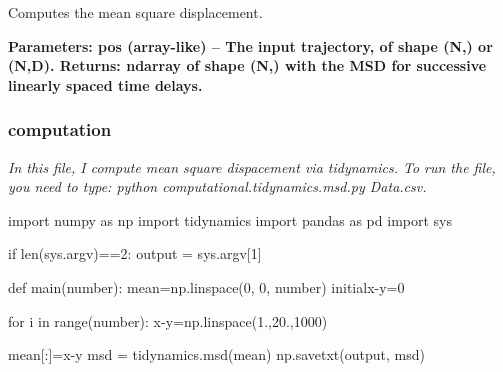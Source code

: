 \documentclass[12pt, a4paper, twoside]{report}
\begin{document}
Computes the mean square displacement.


\textbf{
Parameters:	pos (array-like) – The input trajectory, of shape (N,) or (N,D).\newline
Returns:	ndarray of shape (N,) with the MSD for successive linearly spaced time delays.}

\subsubsection{computation}


\textit{In this file, I compute mean square dispacement via tidynamics.\newline
To run the file, you need to type: python  computational.tidynamics.msd.py Data.csv.}\newline

import numpy as np\newline
import tidynamics\newline
import pandas as pd\newline
import sys\newline

if len(sys.argv)==2:\newline
\hspace*{10mm} output = sys.argv[1]\newline

def main(number):\newline
\hspace*{10mm} mean=np.linspace(0, 0, number)\newline
\hspace*{10mm} initialx-y=0 \newline

\hspace*{10mm} for i in range(number):\newline
\hspace*{20mm} x-y=np.linspace(1.,20.,1000)\newline

\hspace*{10mm}    mean[:]=x-y\newline
\hspace*{10mm}    msd = tidynamics.msd(mean)\newline
\hspace*{10mm}    np.savetxt(output, msd)\newline
\end{document}
